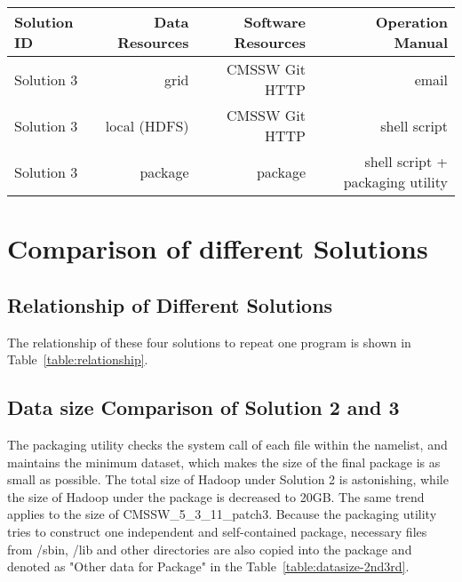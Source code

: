 \documentclass{acm_proc_article-sp}
\begin{document}
\begin{table*}
    \centering
    \begin{tabular}{|l|r|r|r|}
        \hline
        Solution ID & Data Resources & Software Resources & Operation Manual \\ \hline
        Solution 3& grid & CMSSW Git HTTP & email \\ \hline
        Solution 3& local (HDFS) & CMSSW Git HTTP & shell script \\ \hline
        Solution 3& package & package & shell script + packaging utility \\ \hline
    \end{tabular}
    \caption{The relationship of different solutions}
    \label{table:relationship}
\end{table*}



\section{Comparison of different Solutions}
\subsection{Relationship of Different Solutions}
The relationship of these four solutions to repeat one program is shown in Table~\ref{table:relationship}.

\subsection{ Data size Comparison of Solution 2 and 3}
The packaging utility checks the system call of each file within the namelist, and maintains the minimum dataset, which makes the size of the final package is as small as possible. The total size of Hadoop under Solution 2 is astonishing, while the size of Hadoop under the package is decreased to 20GB. The same trend applies to the size of CMSSW\_5\_3\_11\_patch3. Because the packaging utility tries to construct one independent and self-contained package, necessary files  from /sbin, /lib and other directories are also copied into the package and denoted as "Other data for Package" in the Table~\ref{table:datasize-2nd3rd}.
\end{document}
